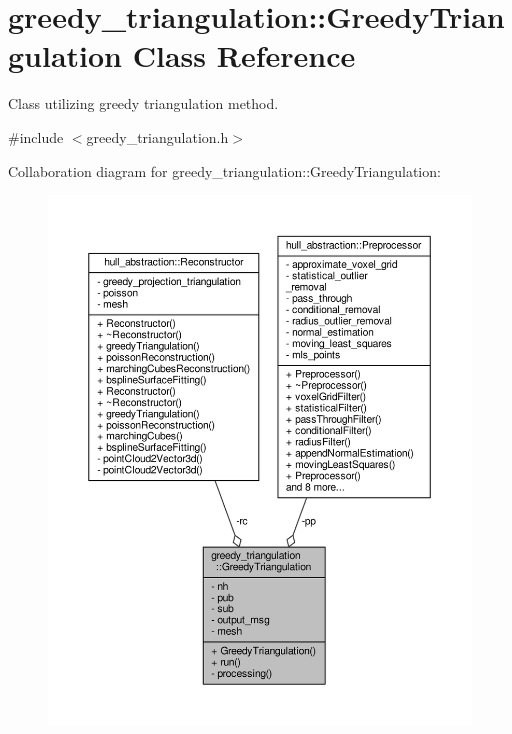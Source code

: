 \hypertarget{classgreedy__triangulation_1_1_greedy_triangulation}{}\section{greedy\+\_\+triangulation\+:\+:Greedy\+Triangulation Class Reference}
\label{classgreedy__triangulation_1_1_greedy_triangulation}


Class utilizing greedy triangulation method.  




{\ttfamily \#include $<$greedy\+\_\+triangulation.\+h$>$}



Collaboration diagram for greedy\+\_\+triangulation\+:\+:Greedy\+Triangulation\+:
\nopagebreak
\begin{figure}[H]
\begin{center}
\leavevmode
\includegraphics[width=350pt]{classgreedy__triangulation_1_1_greedy_triangulation__coll__graph}
\end{center}
\end{figure}

